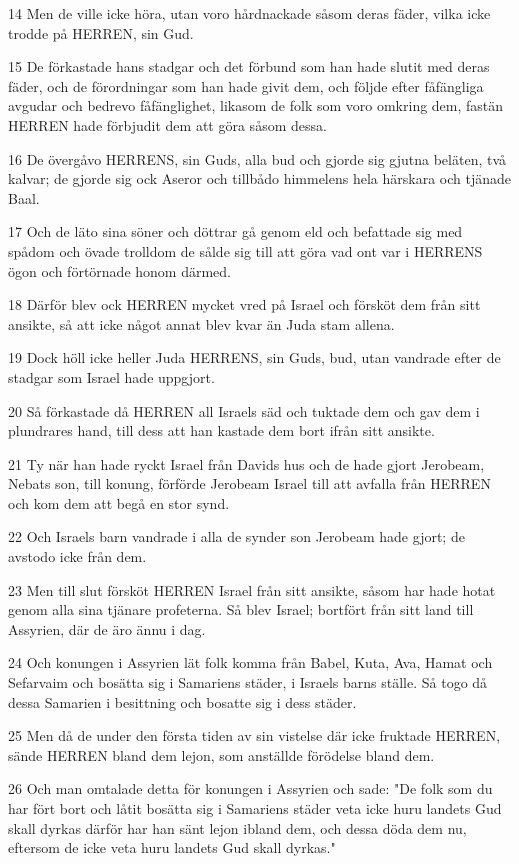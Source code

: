 \par 14 Men de ville icke höra, utan voro hårdnackade såsom deras fäder, vilka icke trodde på HERREN, sin Gud.
\par 15 De förkastade hans stadgar och det förbund som han hade slutit med deras fäder, och de förordningar som han hade givit dem, och följde efter fåfängliga avgudar och bedrevo fåfänglighet, likasom de folk som voro omkring dem, fastän HERREN hade förbjudit dem att göra såsom dessa.
\par 16 De övergåvo HERRENS, sin Guds, alla bud och gjorde sig gjutna beläten, två kalvar; de gjorde sig ock Aseror och tillbådo himmelens hela härskara och tjänade Baal.
\par 17 Och de läto sina söner och döttrar gå genom eld och befattade sig med spådom och övade trolldom de sålde sig till att göra vad ont var i HERRENS ögon och förtörnade honom därmed.
\par 18 Därför blev ock HERREN mycket vred på Israel och försköt dem från sitt ansikte, så att icke något annat blev kvar än Juda stam allena.
\par 19 Dock höll icke heller Juda HERRENS, sin Guds, bud, utan vandrade efter de stadgar som Israel hade uppgjort.
\par 20 Så förkastade då HERREN all Israels säd och tuktade dem och gav dem i plundrares hand, till dess att han kastade dem bort ifrån sitt ansikte.
\par 21 Ty när han hade ryckt Israel från Davids hus och de hade gjort Jerobeam, Nebats son, till konung, förförde Jerobeam Israel till att avfalla från HERREN och kom dem att begå en stor synd.
\par 22 Och Israels barn vandrade i alla de synder son Jerobeam hade gjort; de avstodo icke från dem.
\par 23 Men till slut försköt HERREN Israel från sitt ansikte, såsom har hade hotat genom alla sina tjänare profeterna. Så blev Israel; bortfört från sitt land till Assyrien, där de äro ännu i dag.
\par 24 Och konungen i Assyrien lät folk komma från Babel, Kuta, Ava, Hamat och Sefarvaim och bosätta sig i Samariens städer, i Israels barns ställe. Så togo då dessa Samarien i besittning och bosatte sig i dess städer.
\par 25 Men då de under den första tiden av sin vistelse där icke fruktade HERREN, sände HERREN bland dem lejon, som anställde förödelse bland dem.
\par 26 Och man omtalade detta för konungen i Assyrien och sade: "De folk som du har fört bort och låtit bosätta sig i Samariens städer veta icke huru landets Gud skall dyrkas därför har han sänt lejon ibland dem, och dessa döda dem nu, eftersom de icke veta huru landets Gud skall dyrkas."
